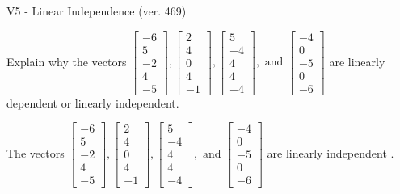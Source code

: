 \begin{exercise}
  \begin{exerciseTitle}V5 - Linear Independence (ver. 469)\end{exerciseTitle}
  \begin{exerciseStatement}
    Explain why the vectors \(\left[\begin{array}{r}
-6 \\
5 \\
-2 \\
4 \\
-5
\end{array}\right] , \left[\begin{array}{r}
2 \\
4 \\
0 \\
4 \\
-1
\end{array}\right] , \left[\begin{array}{r}
5 \\
-4 \\
4 \\
4 \\
-4
\end{array}\right] , \text{ and } \left[\begin{array}{r}
-4 \\
0 \\
-5 \\
0 \\
-6
\end{array}\right]\) are linearly dependent or linearly independent.	


  \end{exerciseStatement}
  \begin{exerciseAnswer}
   The vectors \(\left[\begin{array}{r}
-6 \\
5 \\
-2 \\
4 \\
-5
\end{array}\right] , \left[\begin{array}{r}
2 \\
4 \\
0 \\
4 \\
-1
\end{array}\right] , \left[\begin{array}{r}
5 \\
-4 \\
4 \\
4 \\
-4
\end{array}\right] , \text{ and } \left[\begin{array}{r}
-4 \\
0 \\
-5 \\
0 \\
-6
\end{array}\right]\) are 
  	 linearly independent  .
  


  \end{exerciseAnswer}
\end{exercise}